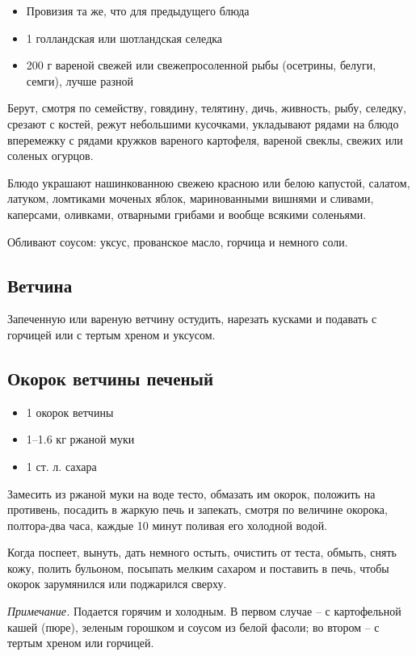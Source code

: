 \begin{itemize}
	\item Провизия та же, что для предыдущего блюда 
    \item 1 голландская или шотландская селедка 
    \item 200 г вареной свежей или свежепросоленной рыбы (осетрины, белуги, семги), лучше разной
\end{itemize}

Берут, смотря по семейству, говядину, телятину, дичь, живность, рыбу, селедку, срезают с костей, режут небольшими кусочками, укладывают рядами на блюдо вперемежку с рядами кружков вареного картофеля, вареной свеклы, свежих или соленых огурцов.

Блюдо украшают нашинкованною свежею красною или белою капустой, салатом, латуком, ломтиками моченых яблок, маринованными вишнями и сливами, каперсами, оливками, отварными грибами и вообще всякими соленьями.

Обливают соусом: уксус, прованское масло, горчица и немного соли.

\subsection{Ветчина}

Запеченную или вареную ветчину остудить, нарезать кусками и подавать с горчицей или с тертым хреном и уксусом.

\subsection{Окорок ветчины печеный}\label{7okorok-vetchiny}

\begin{itemize}
	\item 1 окорок ветчины 
    \item 1–1.6 кг ржаной муки 
    \item 1 ст. л. сахара
\end{itemize}

Замесить из ржаной муки на воде тесто, обмазать им окорок, положить на противень, посадить в жаркую печь и запекать, смотря по величине окорока, полтора-два часа, каждые 10 минут поливая его холодной водой.

Когда поспеет, вынуть, дать немного остыть, очистить от теста, обмыть, снять кожу, полить бульоном, посыпать мелким сахаром и поставить в печь, чтобы окорок зарумянился или поджарился сверху.

\emph{Примечание.} Подается горячим и холодным. В первом случае – с картофельной кашей (пюре), зеленым горошком и соусом из белой фасоли; во втором – с тертым хреном или горчицей.

